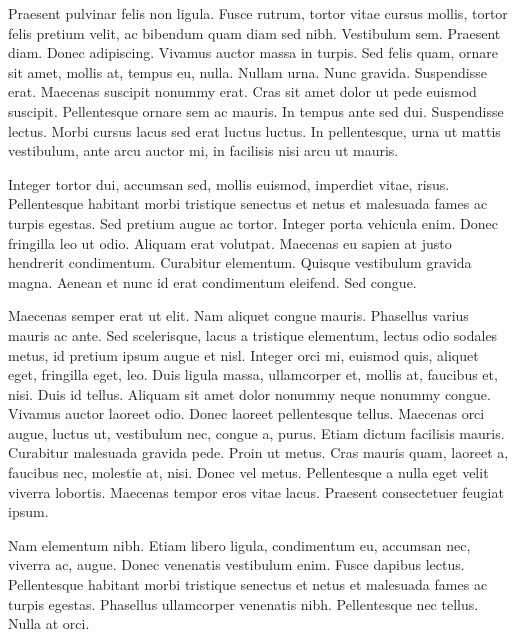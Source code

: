\documentclass{icldt}
\begin{document}
Praesent pulvinar felis non ligula. Fusce rutrum, tortor vitae cursus mollis,
tortor felis pretium velit, ac bibendum quam diam sed nibh. Vestibulum sem.
Praesent diam. Donec adipiscing. Vivamus auctor massa in turpis. Sed felis quam,
ornare sit amet, mollis at, tempus eu, nulla. Nullam urna. Nunc gravida.
Suspendisse erat. Maecenas suscipit nonummy erat. Cras sit amet dolor ut pede
euismod suscipit. Pellentesque ornare sem ac mauris. In tempus ante sed dui.
Suspendisse lectus. Morbi cursus lacus sed erat luctus luctus. In pellentesque,
urna ut mattis vestibulum, ante arcu auctor mi, in facilisis nisi arcu ut
mauris.

Integer tortor dui, accumsan sed, mollis euismod, imperdiet vitae, risus.
Pellentesque habitant morbi tristique senectus et netus et malesuada fames ac
turpis egestas. Sed pretium augue ac tortor. Integer porta vehicula enim. Donec
fringilla leo ut odio. Aliquam erat volutpat. Maecenas eu sapien at justo
hendrerit condimentum. Curabitur elementum. Quisque vestibulum gravida magna.
Aenean et nunc id erat condimentum eleifend. Sed congue.

Maecenas semper erat ut elit. Nam aliquet congue mauris. Phasellus varius mauris
ac ante. Sed scelerisque, lacus a tristique elementum, lectus odio sodales
metus, id pretium ipsum augue et nisl. Integer orci mi, euismod quis, aliquet
eget, fringilla eget, leo. Duis ligula massa, ullamcorper et, mollis at,
faucibus et, nisi. Duis id tellus. Aliquam sit amet dolor nonummy neque nonummy
congue. Vivamus auctor laoreet odio. Donec laoreet pellentesque tellus. Maecenas
orci augue, luctus ut, vestibulum nec, congue a, purus. Etiam dictum facilisis
mauris. Curabitur malesuada gravida pede. Proin ut metus. Cras mauris quam,
laoreet a, faucibus nec, molestie at, nisi. Donec vel metus. Pellentesque a
nulla eget velit viverra lobortis. Maecenas tempor eros vitae lacus. Praesent
consectetuer feugiat ipsum.

Nam elementum nibh. Etiam libero ligula, condimentum eu, accumsan nec, viverra
ac, augue. Donec venenatis vestibulum enim. Fusce dapibus lectus. Pellentesque
habitant morbi tristique senectus et netus et malesuada fames ac turpis egestas.
Phasellus ullamcorper venenatis nibh. Pellentesque nec tellus. Nulla at orci.
\cite{ArjanSeesing2011}


\nocite{*}
\end{document}
